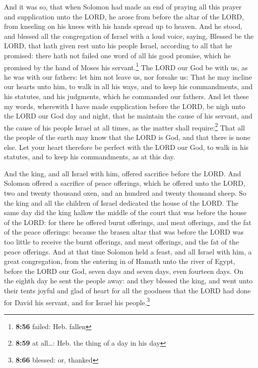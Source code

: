  And it was so, that when Solomon had made an end of
praying all this prayer and supplication unto the LORD, he arose from
before the altar of the LORD, from kneeling on his knees with his hands
spread up to heaven.  And he stood, and blessed all the
congregation of Israel with a loud voice, saying, 
Blessed be the LORD, that hath given rest unto his people Israel,
according to all that he promised: there hath not failed one word of all
his good promise, which he promised by the hand of Moses his
servant.\footnote{\textbf{8:56} failed: Heb. fallen}  The
LORD our God be with us, as he was with our fathers: let him not leave
us, nor forsake us:  That he may incline our hearts unto
him, to walk in all his ways, and to keep his commandments, and his
statutes, and his judgments, which he commanded our fathers.
 And let these my words, wherewith I have made
supplication before the LORD, be nigh unto the LORD our God day and
night, that he maintain the cause of his servant, and the cause of his
people Israel at all times, as the matter shall require:\footnote{\textbf{8:59}
  at all\ldots: Heb. the thing of a day in his day}  That
all the people of the earth may know that the LORD is God, and that
there is none else.  Let your heart therefore be perfect
with the LORD our God, to walk in his statutes, and to keep his
commandments, as at this day.

 And the king, and all Israel with him, offered sacrifice
before the LORD.  And Solomon offered a sacrifice of
peace offerings, which he offered unto the LORD, two and twenty thousand
oxen, and an hundred and twenty thousand sheep. So the king and all the
children of Israel dedicated the house of the LORD.  The
same day did the king hallow the middle of the court that was before the
house of the LORD: for there he offered burnt offerings, and meat
offerings, and the fat of the peace offerings: because the brasen altar
that was before the LORD was too little to receive the burnt offerings,
and meat offerings, and the fat of the peace offerings. 
And at that time Solomon held a feast, and all Israel with him, a great
congregation, from the entering in of Hamath unto the river of Egypt,
before the LORD our God, seven days and seven days, even fourteen days.
 On the eighth day he sent the people away: and they
blessed the king, and went unto their tents joyful and glad of heart for
all the goodness that the LORD had done for David his servant, and for
Israel his people.\footnote{\textbf{8:66} blessed: or, thanked}

